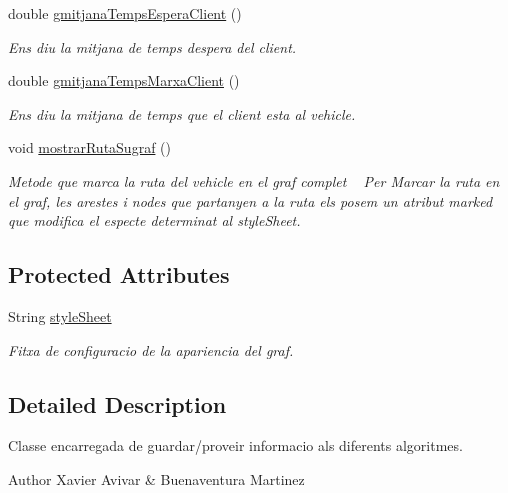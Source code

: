 \begin{DoxyCompactItemize}
double \hyperlink{class_portam_a_pro_p_1_1_ruta_a7668f7adc193b9b23d315ca48141ab71}{gmitjana\+Temps\+Espera\+Client} ()
\begin{DoxyCompactList}\small\item\em Ens diu la mitjana de temps d\textquotesingle{}espera del client. \end{DoxyCompactList}\item 
double \hyperlink{class_portam_a_pro_p_1_1_ruta_a81a83db89e12c72adff5e59539a7a8d1}{gmitjana\+Temps\+Marxa\+Client} ()
\begin{DoxyCompactList}\small\item\em Ens diu la mitjana de temps que el client esta al vehicle. \end{DoxyCompactList}\item 
void \hyperlink{class_portam_a_pro_p_1_1_ruta_ad9ddcde56ed5dae239ea466e76472978}{mostrar\+Ruta\+Sugraf} ()
\begin{DoxyCompactList}\small\item\em Metode que marca la ruta del vehicle en el graf complet ~\newline
 Per Marcar la ruta en el graf, les arestes i nodes que partanyen a la ruta els posem un atribut marked que modifica el especte determinat al style\+Sheet. \end{DoxyCompactList}\end{DoxyCompactItemize}
\subsection*{Protected Attributes}
\begin{DoxyCompactItemize}
\item 
String \hyperlink{class_portam_a_pro_p_1_1_ruta_a5bec0cc3f5e0aac3ac137f2cde37eb4f}{style\+Sheet}
\begin{DoxyCompactList}\small\item\em Fitxa de configuracio de la apariencia del graf. \end{DoxyCompactList}\end{DoxyCompactItemize}


\subsection{Detailed Description}
Classe encarregada de guardar/proveir informacio als diferents algoritmes. 

\begin{DoxyAuthor}{Author}
Xavier Avivar \& Buenaventura Martinez 
\end{DoxyAuthor}


